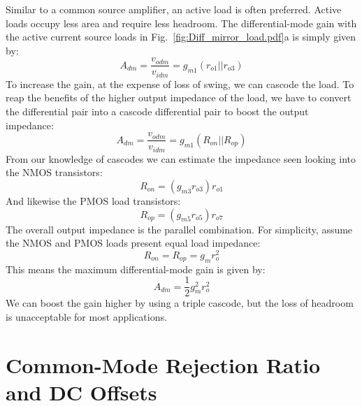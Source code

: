 Similar to a common source amplifier, an active load is often preferred.  Active loads occupy less area and require less headroom.  The differential-mode gain with the active current source loads in Fig.~\ref{fig:Diff_mirror_load.pdf}a is simply given by:
    \begin{equation}
        {A_{dm}} = \frac{{{v_{odm}}}}{{{v_{idm}}}} = {g_{m1}}\left( {{r_{o1}}||{r_{o3}}} \right)
    \end{equation}
To increase the gain, at the expense of loss of swing, we can cascode the load.  To reap the benefits of the higher output impedance of the load, we have to convert the differential pair into a cascode differential pair to boost the output impedance:
    \begin{equation}
        {A_{dm}} = \frac{{{v_{odm}}}}{{{v_{idm}}}} = {g_{m1}}\left( {{R_{on}}||{R_{op}}} \right) 
    \end{equation}
From our knowledge of cascodes we can estimate the impedance seen looking into the NMOS transistors:
    \begin{equation}
        {R_{on}} = \left( {{g_{m3}}{r_{o3}}} \right){r_{o1}} 
    \end{equation}
And likewise the PMOS load transistors:
    \begin{equation}
        {R_{op}} = \left( {{g_{m5}}{r_{o5}}} \right){r_{o7}}
    \end{equation}
The overall output impedance is the parallel combination.  For simplicity, assume the NMOS and PMOS loads present equal load impedance:
    \begin{equation}
        {R_{on}} = {R_{op}} = {g_m}r_o^2
    \end{equation}
This means the maximum differential-mode gain is given by:
    \begin{equation}
        {A_{dm}} = \frac{1}{2}g_m^2r_o^2
    \end{equation}
We can boost the gain higher by using a triple cascode, but the loss of headroom is unacceptable for most applications.
\section{Common-Mode Rejection Ratio and DC Offsets}
\label{sec:cmrr}

